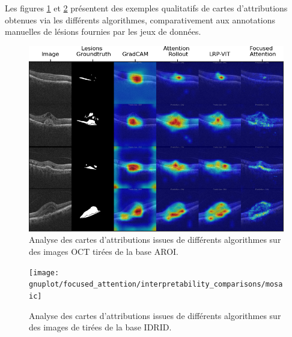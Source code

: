 Les figures \ref{fig:aroivisu} et \ref{fig:mosaic} présentent des exemples qualitatifs de cartes d'attributions obtenues via les différents algorithmes, comparativement aux annotations manuelles de lésions fournies par les jeux de données.
\begin{figure}[h]
	\centering
	\includegraphics[width=1\linewidth]{gnuplot/focused_attention/AROI/AROI_visu}
	\caption{Analyse des cartes d'attributions issues de différents algorithmes sur des images OCT tirées de la base AROI.}
	\label{fig:aroivisu}
\end{figure}
\begin{figure}[h]
	\centering
	\texttt{[image: gnuplot/focused\_attention/interpretability\_comparisons/mosaic]}
	\caption{Analyse des cartes d'attributions issues de différents algorithmes sur des images de \fundus{} tirées de la base IDRID.}
	\label{fig:mosaic}
\end{figure}



